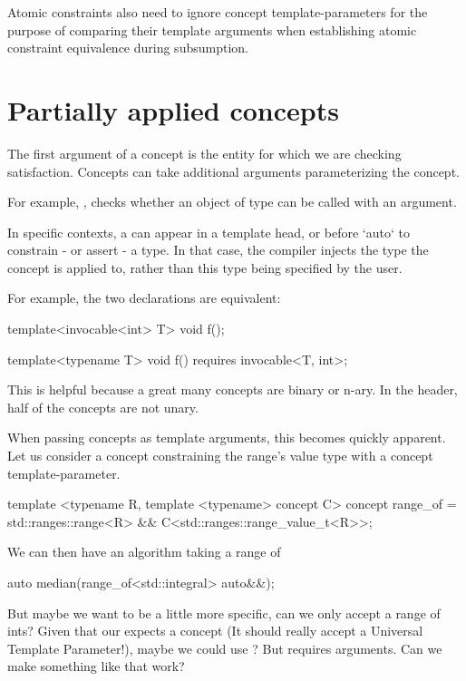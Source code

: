 \documentclass{wg21}
\begin{document}
Atomic constraints also need to ignore concept template-parameters for the purpose
of comparing their template arguments when establishing atomic constraint equivalence during subsumption.


\section{Partially applied concepts}

The first argument of a concept is the entity for which we are checking satisfaction.
Concepts can take additional arguments parameterizing the concept.

For example, , checks whether an object of type  can be called
with an  argument.

In specific contexts, a  can appear in a template head, or before `auto` to constrain - or assert -
a type. In that case, the compiler injects the type the concept is applied to, rather than this type being specified by the user.

For example, the two declarations are equivalent:

\begin{colorblock}
template<invocable<int> T>
void f();

template<typename T>
void f() requires invocable<T, int>;
\end{colorblock}

This is helpful because a great many concepts are binary or n-ary.
In the  header, half of the concepts are not unary.


When passing concepts as template arguments, this becomes quickly apparent.
Let us consider a  concept constraining the range's value type with a concept template-parameter.

\begin{colorblock}
template <typename R, template <typename> concept C>
concept range_of = std::ranges::range<R> && C<std::ranges::range_value_t<R>>;
\end{colorblock}

We can then have an algorithm taking a range of 

\begin{colorblock}
auto median(range_of<std::integral> auto&&);
\end{colorblock}


But maybe we want to be a little more specific, can we only accept a range of ints?
Given that our  expects a concept (It should really accept a Universal Template Parameter!),
maybe we could use ?
But  requires arguments. Can we make something like that work?
\end{document}
